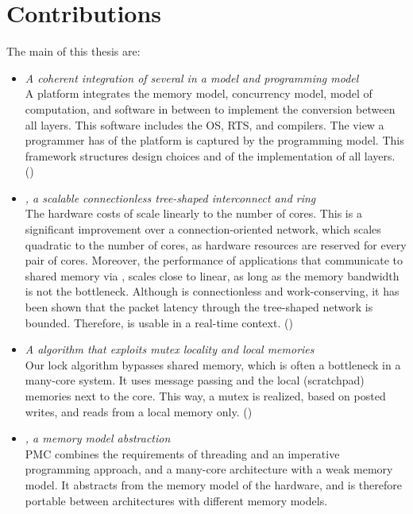 \section{Contributions}

The main  of this thesis are:

\begin{itemize}
\item \emph{A coherent integration of several  in a  model and programming model}\\
	A platform integrates the memory model, concurrency model, model of computation, and software in between to implement the conversion between all layers.
	This software includes the \ac{OS}, \acl{RTS}, and compilers.
	The view a programmer has of the platform is captured by the programming model.
	This framework structures design choices and  of the implementation of all layers.
	()
\item \emph{\Warpfield*, a scalable connectionless tree-shaped interconnect and ring}\\
	The hardware costs of \Warpfield scale linearly to the number of cores.
	This is a significant improvement over a connection-oriented network, which scales quadratic to the number of cores, as hardware resources are reserved for every pair of cores.
	Moreover, the performance of applications that communicate to shared memory via \Warpfield, scales close to linear, as long as the memory bandwidth is not the bottleneck.
	Although \Warpfield is connectionless and work-conserving, it has been shown that the packet latency through the tree-shaped network is bounded.
	Therefore, \Warpfield is usable in a real-time context.
	()
\item \emph{A  algorithm that exploits mutex locality and local memories}\\
	Our lock algorithm bypasses shared memory, which is often a bottleneck in a many-core system.
	It uses message passing and the local (scratchpad) memories next to the core.
	This way, a mutex is realized, based on posted writes, and reads from a local memory only.
	()
\item \emph{, a memory model abstraction}\\
	\Ac{PMC} combines the requirements of threading and an imperative programming approach, and a many-core architecture with a weak memory model.
	It abstracts from the memory model of the hardware, and is therefore portable between architectures with different memory models.

\end{itemize}
